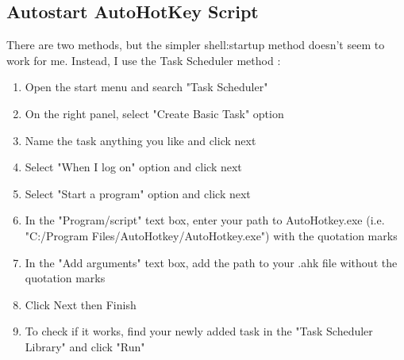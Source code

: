 \subsection{Autostart AutoHotKey Script} \label{SecAutostart}
There are two methods, but the simpler shell:startup method doesn't seem to work for me.
Instead, I use the Task Scheduler method \cite{bashkarla2016how}:
\begin{enumerate}
    \item Open the start menu and search "Task Scheduler"
    \item On the right panel, select "Create Basic Task" option
    \item Name the task anything you like and click next
    \item Select "When I log on" option and click next
    \item Select "Start a program" option and click next
    \item In the "Program/script" text box, enter your path to AutoHotkey.exe
        (i.e. "C:/Program Files/AutoHotkey/AutoHotkey.exe") with the quotation marks
    \item In the "Add arguments" text box, add the path to your .ahk file
        without the quotation marks
    \item Click Next then Finish
    \item To check if it works, find your newly added task in the "Task Scheduler Library" and
       click "Run"
\end{enumerate}

